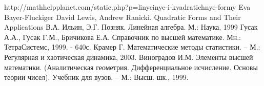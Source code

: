 \documentclass[bachelor, och, coursework, times]{SCWorks}
\begin{document}
\begin{thebibliography}{00} %
http://mathhelpplanet.com/static.php?p=linyeinye-i-kvadratichnye-formy
Eva Bayer-Fluckiger David Lewis, Andrew Ranicki. Quadratic Forms and Their Applications
В.А. Ильин, Э.Г. Позняк. Линейная алгебра. М.: Наука, 1999
Гусак А.А., Гусак Г.М., Бричикова Е.А. Справочник по высшей математике. Мн.: ТетраСистемс, 1999. - 640с. 
Крамер Г. Математические методы статистики. – М.: Регулярная и хаотическая динамика, 2003. 
Виноградов И.М. Элементы высшей математики. (Аналитическая геометрия. Дифференциальное исчисление. Основы теории чисел). Учебник для вузов. – М.: Высш. шк., 1999.
\end{thebibliography}
\end{document}
